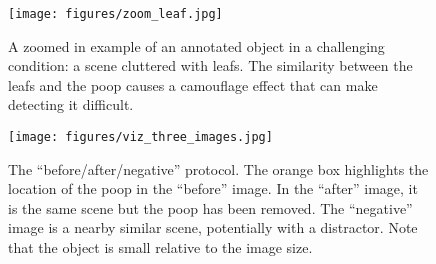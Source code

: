 \documentclass[10pt,twocolumn,letterpaper]{article}
\begin{document}
\begin{figure}[t]
\centering
\texttt{[image: figures/zoom\_leaf.jpg]}
\caption[]{
    A zoomed in example of an annotated object in a challenging
    condition: a scene cluttered with leafs. The similarity between the leafs
    and the poop causes a camouflage effect that can make detecting it difficult.
}
\label{fig:HardCase}
\end{figure}

\begin{figure}[t]
\centering
\texttt{[image: figures/viz\_three\_images.jpg]}
\caption[]{
The ``before/after/negative'' protocol.
The orange box highlights the location of the poop 
in the ``before'' image.
In the ``after'' image, it is the same scene but the poop has been removed.
The ``negative'' image is a nearby similar scene, potentially with a distractor.
Note that the object is small relative to the image size.}
\label{fig:ThreeImages}
\end{figure}
\end{document}
